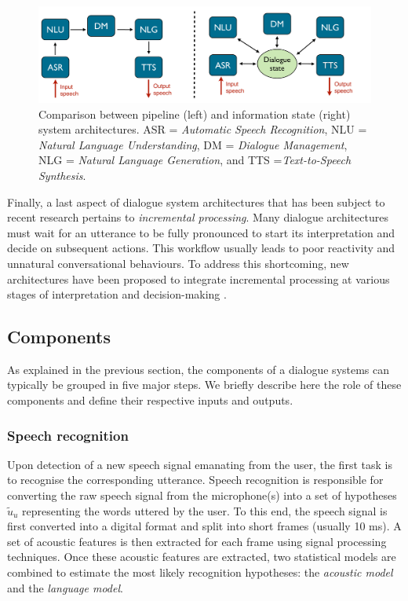  \begin{figure}[h!]
\centering
\includegraphics[scale=0.28]{imgs/architecture_comparison.pdf}
\caption{Comparison between pipeline (left) and information state (right) system architectures.   ASR = \textit{Automatic Speech Recognition}, NLU = \textit{Natural Language Understanding}, DM = \textit{Dialogue Management}, NLG = \textit{Natural Language Generation}, and TTS =\textit{Text-to-Speech Synthesis}.}
\label{fig:architecture_comp}
\end{figure}

Finally, a last aspect of dialogue system architectures that has been subject to recent research pertains to \textit{incremental processing}.  Many dialogue architectures must wait for an utterance to be fully pronounced to start its interpretation and decide on subsequent actions.  This workflow usually leads to poor reactivity and unnatural conversational behaviours.  To address this shortcoming, new architectures have been proposed to integrate incremental processing at various stages of interpretation and decision-making \citep{schlangen2009general}.


\subsection{Components}

As explained in the previous section, the components of a dialogue systems can typically be grouped in five major steps.  We briefly describe here the role of these components and define their respective inputs and outputs.

\subsubsection*{Speech recognition}
Upon detection of a new speech signal emanating from the user, the first task is to recognise the corresponding utterance. Speech recognition is responsible for converting the raw speech signal from the microphone(s) into a set of hypotheses $\tilde{u}_u$ representing the words uttered by the user. To this end, the speech signal is first converted into a digital format and split into short frames (usually 10 ms). A set of acoustic features is then extracted for each frame using signal processing techniques.  Once these acoustic features are extracted, two statistical models are combined to estimate the most likely recognition hypotheses: the \textit{acoustic model} and the \textit{language model}.  

